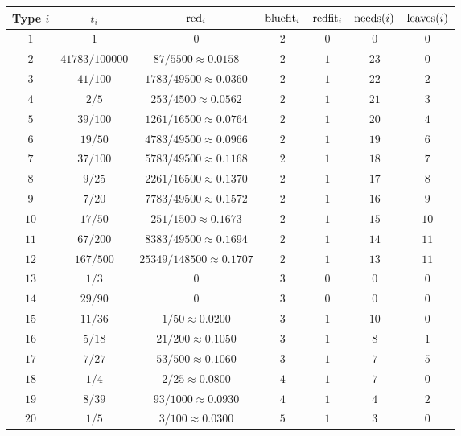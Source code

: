 {\small
	\newpage
	\begin{longtable}{|c|c|c|c|c|c|c|}
		\hline
		Type $i$ & $t_i$ & $\mathrm{red}_i$ & $\mathrm{bluefit}_i$ & $\mathrm{redfit}_i$ & $\mathrm{needs}(i)$ & $\mathrm{leaves}(i)$ \\ 
		\hline \endhead 
		$1$ & $1$ & $0$ & $2$ & $0$ & $0$ & $0$ \\ 
		\hline
		$2$ & $41783 / 100000$ & $87 / 5500\approx 0.0158$ & $2$ & $1$ & $23$ & $0$ \\  \hline
		$3$ & $41 / 100$ & $1783 / 49500\approx 0.0360$ & $2$ & $1$ & $22$ & $2$ \\ \hline
		$4$ & $2 / 5$ & $253 / 4500\approx 0.0562$ & $2$ & $1$ & $21$ & $3$ \\ \hline
		$5$ & $39 / 100$ & $1261 / 16500\approx 0.0764$ & $2$ & $1$ & $20$ & $4$ \\  \hline
		$6$ & $19 / 50$ & $4783 / 49500\approx 0.0966$ & $2$ & $1$ & $19$ & $6$ \\ \hline
		$7$ & $37 / 100$ & $5783 / 49500\approx 0.1168$ & $2$ & $1$ & $18$ & $7$ \\ \hline
		$8$ & $9 / 25$ & $2261 / 16500\approx 0.1370$ & $2$ & $1$ & $17$ & $8$ \\ \hline
		$9$ & $7 / 20$ & $7783 / 49500\approx 0.1572$ & $2$ & $1$ & $16$ & $9$ \\ \hline
		$10$ & $17 / 50$ & $251 / 1500\approx 0.1673$ & $2$ & $1$ & $15$ & $10$ \\ \hline
		$11$ & $67 / 200$ & $8383 / 49500\approx 0.1694$ & $2$ & $1$ & $14$ & $11$ \\ \hline
		$12$ & $167 / 500$ & $25349 / 148500\approx 0.1707$ & $2$ & $1$ & $13$ & $11$ \\ \hline
		$13$ & $1 / 3$ & $0$ & $3$ & $0$ & $0$ & $0$ \\ \hline
		$14$ & $29 / 90$ & $0$ & $3$ & $0$ & $0$ & $0$ \\ \hline
		$15$ & $11 / 36$ & $1 / 50\approx 0.0200$ & $3$ & $1$ & $10$ & $0$ \\  \hline
		$16$ & $5 / 18$ & $21 / 200\approx 0.1050$ & $3$ & $1$ & $8$ & $1$ \\ \hline
		$17$ & $7 / 27$ & $53 / 500\approx 0.1060$ & $3$ & $1$ & $7$ & $5$ \\ \hline
		$18$ & $1 / 4$ & $2 / 25\approx 0.0800$ & $4$ & $1$ & $7$ & $0$ \\ \hline
		$19$ & $8 / 39$ & $93 / 1000\approx 0.0930$ & $4$ & $1$ & $4$ & $2$ \\ \hline
		$20$ & $1 / 5$ & $3 / 100\approx 0.0300$ & $5$ & $1$ & $3$ & $0$ \\ \hline

\end{longtable}}
